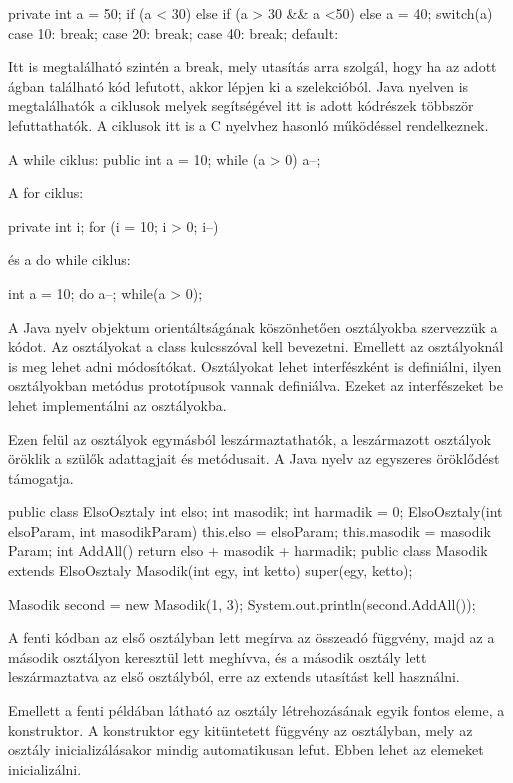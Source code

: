 \begin{java}
private int a = 50;
if (a < 30) {
}
else if (a > 30 && a <50) {
}
else {
}
a = 40;
switch(a) {
	case 10:
		break;
	case 20:
		break;
	case 40:
		break;
	default:
}
\end{java}

Itt is megtalálható szintén a break, mely utasítás arra szolgál, hogy ha az adott ágban található kód lefutott, akkor lépjen ki a szelekcióból.
Java nyelven is megtalálhatók a ciklusok melyek segítségével itt is adott kódrészek többször lefuttathatók. A ciklusok itt is a C nyelvhez hasonló működéssel rendelkeznek.
\begin{java}
A while ciklus:
public int a = 10;
while (a > 0) {
	a--;
}
\end{java}
A for ciklus:
\begin{java}
private int i;
for (i = 10; i > 0; i--) {
}
\end{java}
és a do while ciklus:
\begin{java}
int a = 10;
do {
	a--;
} while(a > 0);
\end{java}

A Java nyelv objektum orientáltságának köszönhetően osztályokba szervezzük a kódot. Az osztályokat a class kulcsszóval kell bevezetni. Emellett az osztályoknál is meg lehet adni módosítókat. Osztályokat lehet interfészként is definiálni, ilyen osztályokban metódus prototípusok vannak definiálva. Ezeket az interfészeket be lehet implementálni az osztályokba.

Ezen felül az osztályok egymásból leszármaztathatók, a leszármazott osztályok öröklik a szülők adattagjait és metódusait. A Java nyelv az egyszeres öröklődést támogatja.
\begin{java}
public class ElsoOsztaly {
	int elso; int masodik; int harmadik = 0;
	ElsoOsztaly(int elsoParam, int masodikParam) {
		this.elso = elsoParam;
		this.masodik = masodik Param;
	}
	int AddAll() {
		return elso + masodik + harmadik;
	}
}
public class Masodik extends ElsoOsztaly {
	Masodik(int egy, int ketto) {
		super(egy, ketto);
	}
}

Masodik second = new Masodik(1, 3);
System.out.println(second.AddAll());
\end{java}

A fenti kódban az első osztályban lett megírva az összeadó függvény, majd az a második osztályon keresztül lett meghívva, és a második osztály lett leszármaztatva az első osztályból, erre az extends utasítást kell használni.

Emellett a fenti példában látható az osztály létrehozásának egyik fontos eleme, a konstruktor. A konstruktor egy kitüntetett függvény az osztályban, mely az osztály inicializálásakor mindig automatikusan lefut. Ebben lehet az elemeket inicializálni.

